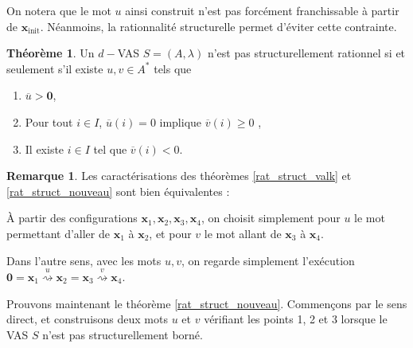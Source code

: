 \documentclass[a4paper,final]{article}
\theoremstyle{definition}
\newtheorem{Theorem}{Théorème}
\newtheorem*{Remark}{Remarque}
\let\geq\geqslant
\newcommand{\alain}[1]{\textcolor{blue}{#1}}
\newcommand{\transZ}[1]{\ensuremath{\stackrel{#1}{\rightsquigarrow}}}
\newcommand{\vect}[1]{\ensuremath{\mathbf{#1}}}
\newcommand{\xinit}{\ensuremath{\vect{x}_\text{init}}}
\newcommand{\valeur}[1]{\ensuremath{\overline{#1}}}
\begin{document}
On notera que le mot $u$ ainsi construit n'est pas forcément franchissable à partir de $\xinit$.
Néanmoins, la rationnalité structurelle permet d'éviter cette contrainte.

\begin{Theorem}\label{conf_struct_rat}
\label{rat_struct_nouveau}
Un $d-$VAS $S=(A,\lambda)$ n'est pas structurellement rationnel si et seulement s'il existe $u,v\in A^*$ tels que 
\begin{enumerate}
    \item $\valeur{u} > \vect{0}$,
    \item Pour tout $i \in I$, $\valeur{u}(i)=0$ implique $\valeur{v}(i) \geq 0$ ,
    \item Il existe $i\in I$ tel que $\valeur{v}(i) < 0$.
\end{enumerate}
\end{Theorem}

\begin{Remark}
Les caractérisations des théorèmes \ref{rat_struct_valk} et \ref{rat_struct_nouveau} sont bien équivalentes :

\noindent À partir des configurations $\vect{x}_1, \vect{x}_2, \vect{x}_3, \vect{x}_4$, on choisit simplement pour $u$ le mot permettant d'aller de $\vect{x}_1$ à $\vect{x}_2$, et pour $v$ le mot allant de $\vect{x}_3$ à $\vect{x}_4$.

\noindent Dans l'autre sens, avec les mots $u,v$, on regarde simplement l'exécution $\vect{0} = \vect{x}_1 \transZ{u} \vect{x}_2 = \vect{x}_3 \transZ{v} \vect{x}_4$.
\end{Remark}

Prouvons maintenant le théorème \ref{rat_struct_nouveau}.
Commençons par le sens direct, et construisons deux mots $u$ et $v$ vérifiant les points 1, 2 et 3 lorsque le VAS $S$ n'est pas structurellement borné.
\end{document}
